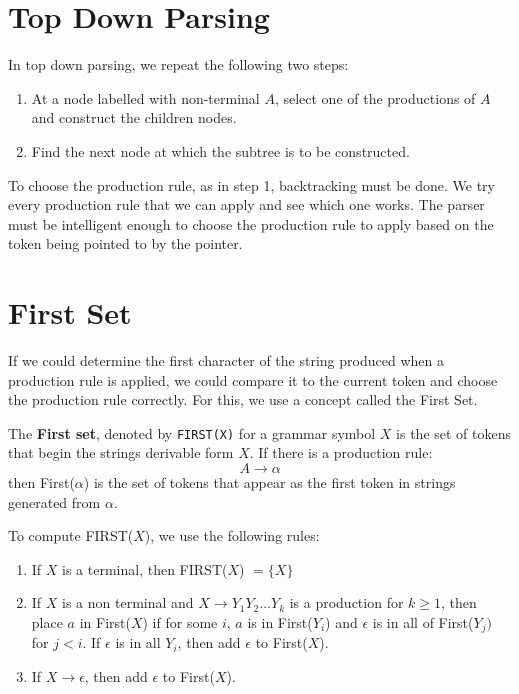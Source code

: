 \documentclass[12pt,letterpaper]{amsbook}
\theoremstyle{definition}
\begin{document}
\section{Top Down Parsing}

In top down parsing, we repeat the following two steps:

\begin{enumerate}
  \item At a node labelled with non-terminal $A$, select one of the productions of $A$ and construct the children nodes.
  \item Find the next node at which the subtree is to be constructed.
\end{enumerate}

To choose the production rule, as in step 1, backtracking must be done. We try every production rule that we can apply and see which one works. The parser must be intelligent enough to choose the production rule to apply based on the token being pointed to by the pointer.

\section{First Set}

If we could determine the first character of the string produced when a production rule is applied, we could compare it to the current token and choose the production rule correctly. For this, we use a concept called the First Set.

The \textbf{First set}, denoted by \texttt{FIRST(X)} for a grammar symbol $X$ is the set of tokens that begin the strings derivable form $X$. If there is a production rule:
\[A \rightarrow \alpha\]
then First($\alpha$) is the set of tokens that appear as the first token in strings generated from $\alpha$.

To compute FIRST($X$), we use the following rules:

\begin{enumerate}
  \item If $X$ is a terminal, then FIRST($X$) $= \{X\}$
  \item If $X$ is a non terminal and $X \rightarrow Y_1Y_2...Y_k$ is a production for $k \geq 1$, then place $a$ in First($X$) if for some $i$, $a$ is in First($Y_i$) and $\epsilon$ is in all of First($Y_j)$ for $j < i$. If $\epsilon$ is in all $Y_i$, then add $\epsilon$ to First($X$).
  \item If $X \rightarrow \epsilon$, then add $\epsilon$ to First($X$).
\end{enumerate}
\end{document}
